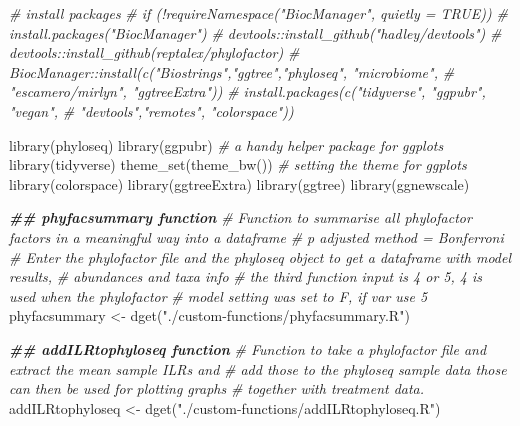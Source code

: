 \documentclass[
]{book}
\newenvironment{Shaded}{\begin{snugshade}}{\end{snugshade}}
\newcommand{\CommentTok}[1]{\textcolor[rgb]{0.56,0.35,0.01}{\textit{#1}}}
\newcommand{\DocumentationTok}[1]{\textcolor[rgb]{0.56,0.35,0.01}{\textbf{\textit{#1}}}}
\newcommand{\FunctionTok}[1]{\textcolor[rgb]{0.00,0.00,0.00}{#1}}
\newcommand{\NormalTok}[1]{#1}
\newcommand{\OtherTok}[1]{\textcolor[rgb]{0.56,0.35,0.01}{#1}}
\newcommand{\StringTok}[1]{\textcolor[rgb]{0.31,0.60,0.02}{#1}}
\begin{document}
\begin{Shaded}
\begin{Highlighting}[]
\CommentTok{\# install packages}
\CommentTok{\# if (!requireNamespace("BiocManager", quietly = TRUE))}
\CommentTok{\#   install.packages("BiocManager")}
\CommentTok{\# devtools::install\_github("hadley/devtools")}
\CommentTok{\# devtools::install\_github(\textquotesingle{}reptalex/phylofactor\textquotesingle{})}
\CommentTok{\# BiocManager::install(c("Biostrings","ggtree","phyloseq", "microbiome",}
\CommentTok{\#                        "escamero/mirlyn", "ggtreeExtra"))}
\CommentTok{\# install.packages(c("tidyverse", "ggpubr", "vegan",}
\CommentTok{\#                   "devtools","remotes", "colorspace"))}

\FunctionTok{library}\NormalTok{(phyloseq)}
\FunctionTok{library}\NormalTok{(ggpubr)       }\CommentTok{\# a handy helper package for ggplots}
\FunctionTok{library}\NormalTok{(tidyverse)}
\FunctionTok{theme\_set}\NormalTok{(}\FunctionTok{theme\_bw}\NormalTok{())  }\CommentTok{\# setting the theme for ggplots}
\FunctionTok{library}\NormalTok{(colorspace)}
\FunctionTok{library}\NormalTok{(ggtreeExtra)}
\FunctionTok{library}\NormalTok{(ggtree)}
\FunctionTok{library}\NormalTok{(ggnewscale)}
 
\DocumentationTok{\#\# phyfacsummary function }
\CommentTok{\# Function to summarise all phylofactor factors in a meaningful way into a dataframe}
\CommentTok{\# p adjusted method = Bonferroni}
\CommentTok{\# Enter the phylofactor file and the phyloseq object to get a dataframe with model results, }
\CommentTok{\# abundances and taxa info}
\CommentTok{\# the third function input is \textquotesingle{}4\textquotesingle{} or \textquotesingle{}5\textquotesingle{},  4 is used when the phylofactor }
\CommentTok{\# model setting was set to \textquotesingle{}F\textquotesingle{}, if \textquotesingle{}var\textquotesingle{} use 5}
\NormalTok{phyfacsummary }\OtherTok{\textless{}{-}} \FunctionTok{dget}\NormalTok{(}\StringTok{"./custom{-}functions/phyfacsummary.R"}\NormalTok{)}

\DocumentationTok{\#\# addILRtophyloseq function }
\CommentTok{\# Function to take a phylofactor file and extract the mean sample ILRs and }
\CommentTok{\# add those to the phyloseq sample data those can then be used for plotting graphs }
\CommentTok{\# together with treatment data. }
\NormalTok{addILRtophyloseq }\OtherTok{\textless{}{-}} \FunctionTok{dget}\NormalTok{(}\StringTok{"./custom{-}functions/addILRtophyloseq.R"}\NormalTok{)}


\end{Highlighting}
\end{Shaded}
\end{document}
